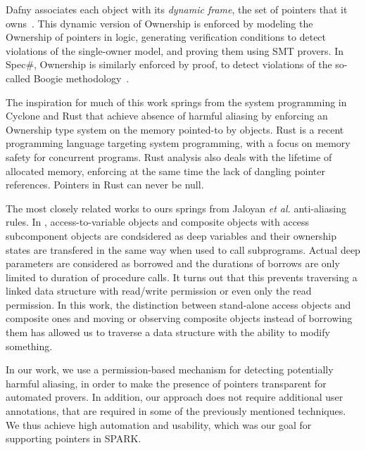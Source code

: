 \documentclass{llncs}
\begin{document}
\smallskip
Dafny associates each object with its \emph{dynamic frame}, the set of pointers that it owns~\cite{Leino10}. This dynamic version of Ownership is
enforced by modeling the Ownership of pointers in logic, generating verification conditions to detect violations of the single-owner model, and proving
them using SMT provers. In Spec\#, Ownership is similarly enforced by proof, to detect violations of the so-called Boogie methodology~\cite{Boogie}.

\smallskip
The inspiration for much of this work springs from the system programming in Cyclone \cite{Grossman2002} and Rust \cite{Balasubramanian17} that achieve absence of
harmful aliasing by enforcing an Ownership type system on the memory pointed-to by objects. Rust is a recent programming language targeting system
programming, with a focus on memory safety for concurrent programs.
Rust analysis also deals with the lifetime of allocated memory, enforcing
at the same time the lack of dangling pointer references. Pointers in Rust can never be null.

\smallskip
The most closely related works to ours springs from Jaloyan \textit{et al.} \cite{Jaloyan18} anti-aliasing rules. In \cite{Jaloyan18}, access-to-variable objects
and composite objects with access subcomponent objects are condsidered as deep variables and their ownership states are transfered in the same way when used to call subprograms.
Actual deep parameters are considered as borrowed and the durations of borrows are only limited to duration of procedure calls.   
It turns out that this prevents traversing a linked data structure with read/write permission or even only the read permission. In this work, the distinction between stand-alone access
objects and composite ones and moving or observing composite objects instead of borrowing them has allowed us to traverse a data structure with the ability to modify something. 

\smallskip
In our work, we use a permission-based mechanism for detecting potentially harmful aliasing, in order to make the presence of pointers transparent for automated provers.
In addition, our approach does not require additional user annotations, that are required in some of the previously mentioned techniques. We thus achieve high automation
and usability, which was our goal for supporting pointers in SPARK.
\end{document}
